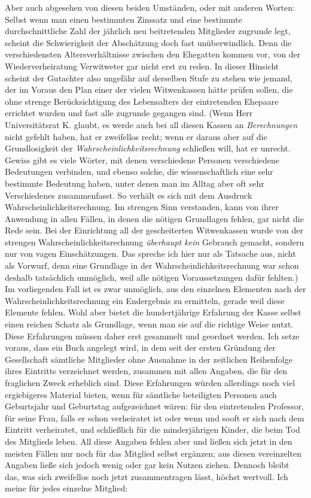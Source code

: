 Aber auch abgesehen von diesen beiden Umständen, oder mit anderen Worten: Selbst wenn man einen bestimmten Zinssatz und eine bestimmte durchschnittliche Zahl der jährlich neu beitretenden Mitglieder zugrunde legt, scheint die Schwierigkeit der Abschätzung doch fast unüberwindlich. Denn die verschiedensten Altersverhältnisse zwischen den Ehegatten kommen vor, von der Wiederverheiratung Verwitweter gar nicht erst zu reden. In dieser Hinsicht scheint der Gutachter also ungefähr auf derselben Stufe zu stehen wie jemand, der im Voraus den Plan einer der vielen Witwenkassen hätte prüfen sollen, die ohne strenge Berücksichtigung des Lebensalters der eintretenden Ehepaare errichtet wurden und fast alle zugrunde gegangen sind. (Wenn Herr Universitätsrat K. glaubt, es werde auch bei all diesen Kassen an \textit{Berechnungen} nicht gefehlt haben, hat er zweifellos recht; wenn er daraus aber auf die Grundlosigkeit der \textit{Wahrscheinlichkeitsrechnung} schließen will, hat er unrecht. Gewiss gibt es viele Wörter, mit denen verschiedene Personen verschiedene Bedeutungen verbinden, und ebenso solche, die wissenschaftlich eine sehr bestimmte Bedeutung haben, unter denen man im Alltag aber oft sehr Verschiedenes zusammenfasst. So verhält es sich mit dem Ausdruck Wahrscheinlichkeitsrechnung. Im strengen Sinn verstanden, kann von ihrer Anwendung in allen Fällen, in denen die nötigen Grundlagen fehlen, gar nicht die Rede sein. Bei der Einrichtung all der gescheiterten Witwenkassen wurde von der strengen Wahrscheinlichkeitsrechnung \textit{überhaupt kein} Gebrauch gemacht, sondern nur von vagen Einschätzungen. Das spreche ich hier nur als Tatsache aus, nicht als Vorwurf, denn eine Grundlage in der Wahrscheinlichkeitsrechnung war schon deshalb tatsächlich unmöglich, weil alle nötigen Voraussetzungen dafür fehlten.) Im vorliegenden Fall ist es zwar unmöglich, aus den einzelnen Elementen nach der Wahrscheinlichkeitsrechnung ein Endergebnis zu ermitteln, gerade weil diese Elemente fehlen. Wohl aber bietet die hundertjährige Erfahrung der Kasse selbst einen reichen Schatz als Grundlage, wenn man sie auf die richtige Weise nutzt. Diese Erfahrungen müssen daher erst gesammelt und geordnet werden. Ich setze voraus, dass ein Buch angelegt wird, in dem seit der ersten Gründung der Gesellschaft sämtliche Mitglieder ohne Ausnahme in der zeitlichen Reihenfolge ihres Eintritts verzeichnet werden, zusammen mit allen Angaben, die für den fraglichen Zweck erheblich sind. Diese Erfahrungen würden allerdings noch viel ergiebigeres Material bieten, wenn für sämtliche beteiligten Personen auch Geburtsjahr und Geburtstag aufgezeichnet wären: für den eintretenden Professor, für seine Frau, falls er schon verheiratet ist oder wenn und sooft er sich nach dem Eintritt verheiratet, und schließlich für die minderjährigen Kinder, die beim Tod des Mitglieds leben. All diese Angaben fehlen aber und ließen sich jetzt in den meisten Fällen nur noch für das Mitglied selbst ergänzen; aus diesen vereinzelten Angaben ließe sich jedoch wenig oder gar kein Nutzen ziehen. Dennoch bleibt das, was sich zweifellos noch jetzt zusammentragen lässt, höchst wertvoll. Ich meine für jedes einzelne Mitglied:

